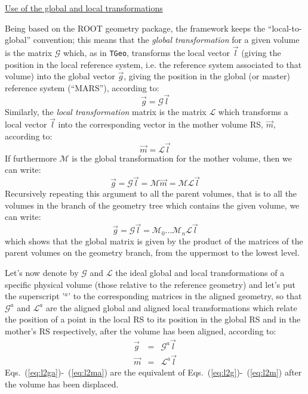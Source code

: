 \documentclass[12pt,a4paper,twoside]{article}
\makeatletter
\newcommand {\ROOT} {ROOT\@\xspace}
\newcommand{\tgeo}{\lstinline!TGeo!}
\makeatother
\begin{document}
{\underline{Use of the global and local transformations}

Being based on the \ROOT geometry package, the framework keeps the
``local-to-global'' convention; this means that the \emph{global
transformation} for a given volume is the matrix $\mathcal{G}$ which, as in
\tgeo, transforms the local vector $\vec{l}$ (giving the position in the
local reference system, i.e. the reference system associated to that volume)
into the global vector $\vec{g}$, giving the position in the
global (or master) reference system (``MARS''), according to:
\begin{equation}
\label{eq:l2g}
\vec{g} = \mathcal{G}\vec{l}
\end{equation}
Similarly, the \emph{local transformation} matrix is the
matrix $\mathcal{L}$ which transforms a local vector $\vec{l}$ into the
corresponding vector in the mother volume RS, $\vec{m}$, according to:
\begin{equation}
\label{eq:l2m}
\vec{m} = \mathcal{L}\vec{l}
\end{equation}
If furthermore $\mathcal{M}$ is the global transformation for the
mother volume, then we can write:
  $$ \vec{g} = \mathcal{G}\vec{l} = \mathcal{M}\vec{m} = \mathcal{M}\mathcal{L}\vec{l} $$
Recursively repeating this argument to all the parent volumes, that is
to all the volumes in the branch of the geometry tree which
contains the given volume, we can write:
  $$ \vec{g} = \mathcal{G}\vec{l} = \mathcal{M}_0...\mathcal{M}_n\mathcal{L}\vec{l} $$
which shows that the global matrix is given by the product of the
matrices of the parent volumes on the geometry branch, from the
uppermost to the lowest level.

Let's now denote by $\mathcal{G}$ and $ \mathcal{L}$ the ideal global
and local transformations of a specific physical volume (those
relative to the reference geometry) and let's put
the superscript '$^a$' to the corresponding matrices in the aligned
geometry, so that $\mathcal{G}^a$ and $ \mathcal{L}^a$ are the aligned
global and aligned local transformations which relate the position of
a point in the local RS to its position in the global RS and in the
mother's RS respectively, after the volume has been aligned, according
to:
\begin{eqnarray}
\vec{g} &=& \mathcal{G}^a\vec{l} \label{eq:l2ga}\\ 
\vec{m} &=& \mathcal{L}^a\vec{l} \label{eq:l2ma}
\end{eqnarray}
Eqs.~(\ref{eq:l2ga})-~(\ref{eq:l2ma}) are the equivalent of
Eqs.~(\ref{eq:l2g})-~(\ref{eq:l2m}) after the volume has
been displaced.

}
\end{document}
